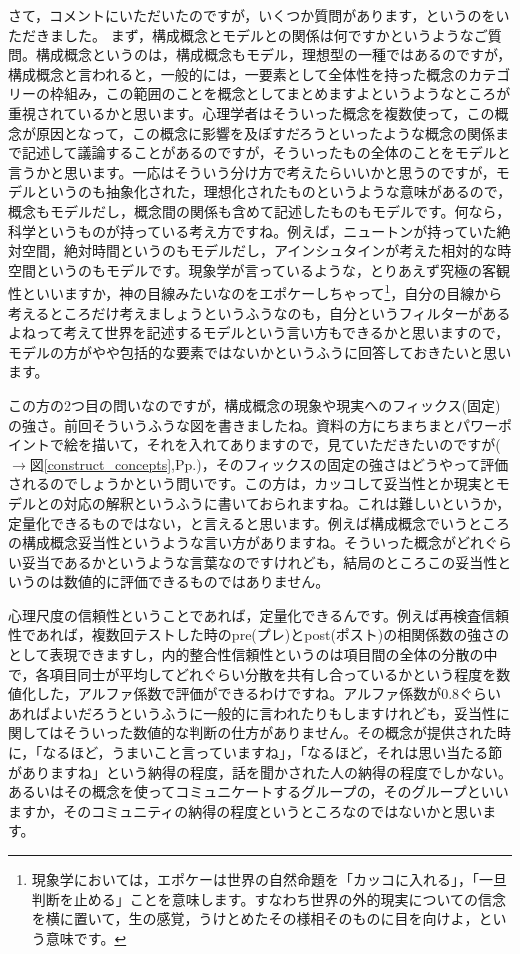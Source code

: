 \documentclass{ltjsbook}
\begin{document}
さて，コメントにいただいたのですが，いくつか質問があります，というのをいただきました。
まず，構成概念とモデルとの関係は何ですかというようなご質問。構成概念というのは，構成概念もモデル，理想型の一種ではあるのですが，構成概念と言われると，一般的には，一要素として全体性を持った概念のカテゴリーの枠組み，この範囲のことを概念としてまとめますよというようなところが重視されているかと思います。心理学者はそういった概念を複数使って，この概念が原因となって，この概念に影響を及ぼすだろうといったような概念の関係まで記述して議論することがあるのですが，そういったもの全体のことをモデルと言うかと思います。一応はそういう分け方で考えたらいいかと思うのですが，モデルというのも抽象化された，理想化されたものというような意味があるので，概念もモデルだし，概念間の関係も含めて記述したものもモデルです。何なら，科学というものが持っている考え方ですね。例えば，ニュートンが持っていた絶対空間，絶対時間というのもモデルだし，アインシュタインが考えた相対的な時空間というのもモデルです。現象学が言っているような，とりあえず究極の客観性といいますか，神の目線みたいなのをエポケーしちゃって\footnote{現象学においては，エポケーは世界の自然命題を「カッコに入れる」，「一旦判断を止める」ことを意味します。すなわち世界の外的現実についての信念を横に置いて，生の感覚，うけとめたその様相そのものに目を向けよ，という意味です。}，自分の目線から考えるところだけ考えましょうというふうなのも，自分というフィルターがあるよねって考えて世界を記述するモデルという言い方もできるかと思いますので，モデルの方がやや包括的な要素ではないかというふうに回答しておきたいと思います。

この方の2つ目の問いなのですが，構成概念の現象や現実へのフィックス(固定)の強さ。前回そういうふうな図を書きましたね。資料の方にちまちまとパワーポイントで絵を描いて，それを入れてありますので，見ていただきたいのですが($\to$図\ref{construct_concepts},Pp.\pageref{construct_concepts})，そのフィックスの固定の強さはどうやって評価されるのでしょうかという問いです。この方は，カッコして妥当性とか現実とモデルとの対応の解釈というふうに書いておられますね。これは難しいというか，定量化できるものではない，と言えると思います。例えば構成概念でいうところの構成概念妥当性というような言い方がありますね。そういった概念がどれぐらい妥当であるかというような言葉なのですけれども，結局のところこの妥当性というのは数値的に評価できるものではありません。

心理尺度の信頼性ということであれば，定量化できるんです。例えば再検査信頼性であれば，複数回テストした時のpre(プレ)とpost(ポスト)の相関係数の強さのとして表現できますし，内的整合性信頼性というのは項目間の全体の分散の中で，各項目同士が平均してどれぐらい分散を共有し合っているかという程度を数値化した，アルファ係数で評価ができるわけですね。アルファ係数が0.8ぐらいあればよいだろうというふうに一般的に言われたりもしますけれども，妥当性に関してはそういった数値的な判断の仕方がありません。その概念が提供された時に，「なるほど，うまいこと言っていますね」，「なるほど，それは思い当たる節がありますね」という納得の程度，話を聞かされた人の納得の程度でしかない。あるいはその概念を使ってコミュニケートするグループの，そのグループといいますか，そのコミュニティの納得の程度というところなのではないかと思います。
\end{document}
